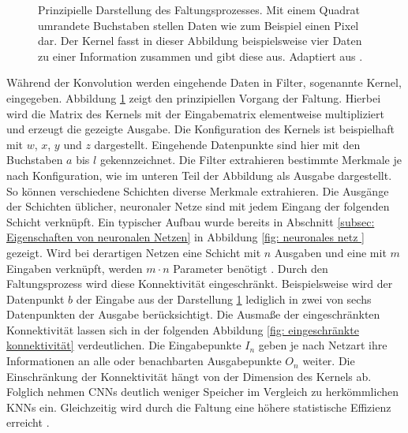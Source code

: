 \begin{figure}[H]
			\caption{Prinzipielle Darstellung des Faltungsprozesses. Mit einem Quadrat umrandete Buchstaben stellen Daten wie zum Beispiel einen Pixel dar. Der Kernel fasst in dieser Abbildung beispielsweise vier Daten zu einer Information zusammen und gibt diese aus. Adaptiert aus \cite{deeplearning}.}
			\label{fig: faltung }
		\end{figure}
		
		
		Während der Konvolution werden eingehende Daten in Filter, sogenannte Kernel, eingegeben. Abbildung \ref{fig: faltung } zeigt den prinzipiellen Vorgang der Faltung. Hierbei wird die Matrix des Kernels mit der Eingabematrix elementweise multipliziert und erzeugt die gezeigte Ausgabe. Die Konfiguration des Kernels ist beispielhaft mit $w$, $x$, $y$ und $z$ dargestellt. Eingehende Datenpunkte sind hier mit den Buchstaben $a$ bis $l$ gekennzeichnet. Die Filter extrahieren bestimmte Merkmale je nach Konfiguration, wie im unteren Teil der Abbildung als Ausgabe dargestellt. So können verschiedene Schichten diverse Merkmale extrahieren. Die Ausgänge der Schichten üblicher, neuronaler Netze sind mit jedem Eingang der folgenden Schicht verknüpft. Ein typischer Aufbau wurde bereits in Abschnitt \ref{subsec: Eigenschaften von neuronalen Netzen} in Abbildung \ref{fig: neuronales netz } gezeigt. Wird bei derartigen Netzen eine Schicht mit $n$ Ausgaben und eine mit $m$ Eingaben verknüpft, werden $m \cdot n$ Parameter benötigt \cite{deeplearning}. Durch den Faltungsprozess wird diese Konnektivität eingeschränkt. Beispielsweise wird der Datenpunkt $b$ der Eingabe aus der Darstellung \ref{fig: faltung } lediglich in zwei von sechs Datenpunkten der Ausgabe berücksichtigt. Die Ausmaße der eingeschränkten Konnektivität lassen sich in der folgenden Abbildung \ref{fig: eingeschränkte konnektivität} verdeutlichen. Die Eingabepunkte $I_n$ geben je nach Netzart ihre Informationen an alle oder benachbarten Ausgabepunkte $O_n$ weiter. Die Einschränkung der Konnektivität hängt von der Dimension des Kernels ab. Folglich nehmen CNNs deutlich weniger Speicher im Vergleich zu herkömmlichen KNNs ein\cite{deeplearning}. Gleichzeitig wird durch die Faltung eine höhere statistische Effizienz erreicht \cite{deeplearning}.\\
		
